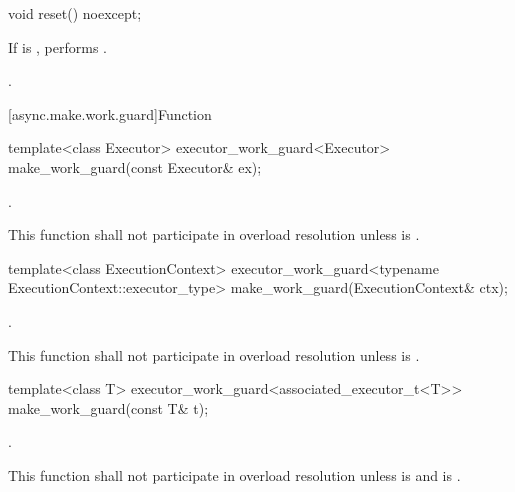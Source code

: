 \begin{itemdecl}
void reset() noexcept;
\end{itemdecl}

\begin{itemdescr}
\pnum
\effects If  is , performs .

\pnum
\postconditions {}.
\end{itemdescr}




[async.make.work.guard]{Function }

\begin{itemdecl}
template<class Executor>
  executor_work_guard<Executor>
    make_work_guard(const Executor& ex);
\end{itemdecl}

\begin{itemdescr}
\pnum
\returns {}.

\pnum
\remarks This function shall not participate in overload resolution unless  is .
\end{itemdescr}

\begin{itemdecl}
template<class ExecutionContext>
  executor_work_guard<typename ExecutionContext::executor_type>
    make_work_guard(ExecutionContext& ctx);
\end{itemdecl}

\begin{itemdescr}
\pnum
\returns {}.

\pnum
\remarks This function shall not participate in overload resolution unless  is .
\end{itemdescr}

\begin{itemdecl}
template<class T>
  executor_work_guard<associated_executor_t<T>>
    make_work_guard(const T& t);
\end{itemdecl}

\begin{itemdescr}
\pnum
\returns {}.

\pnum
\remarks This function shall not participate in overload resolution unless  is  and  is .
\end{itemdescr}

